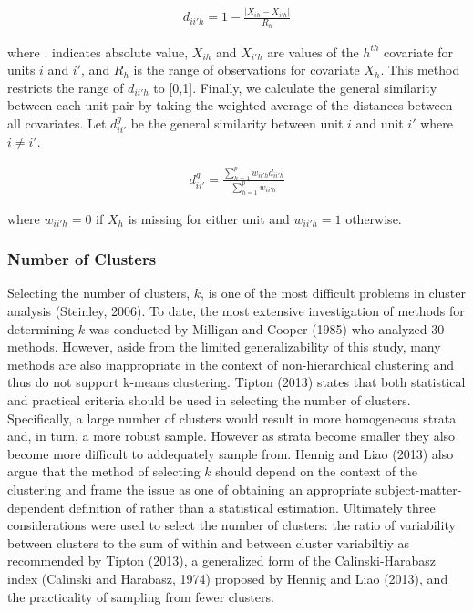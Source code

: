 \documentclass[floatsintext,man]{apa6}
\theoremstyle{definition}
\theoremstyle{definition}
\theoremstyle{definition}
\theoremstyle{remark}
\begin{document}
\begin{align}
  d_{ii'h} = 1 - \frac{|X_{ih} - X_{i'h}|}{R_h}
\end{align}

where \textbar{}.\textbar{} indicates absolute value, \(X_{ih}\) and
\(X_{i'h}\) are values of the \(h^{th}\) covariate for units \(i\) and
\(i'\), and \(R_h\) is the range of observations for covariate \(X_h\).
This method restricts the range of \(d_{ii'h}\) to {[}0,1{]}. Finally,
we calculate the general similarity between each unit pair by taking the
weighted average of the distances between all covariates. Let
\(d^{g}_{ii'}\) be the general similarity between unit \(i\) and unit
\(i'\) where \(i \ne i'\).

\begin{align}
  d^{g}_{ii'} = \frac{\sum^p_{h = 1}w_{ii'h}d_{ii'h}}{\sum^p_{h = 1}w_{ii'h}}
\end{align}

where \(w_{ii'h} = 0\) if \(X_h\) is missing for either unit and
\(w_{ii'h} = 1\) otherwise.

\subsubsection{Number of Clusters}\label{number-of-clusters}

Selecting the number of clusters, \(k\), is one of the most difficult
problems in cluster analysis (Steinley, 2006). To date, the most
extensive investigation of methods for determining \(k\) was conducted
by Milligan and Cooper (1985) who analyzed 30 methods. However, aside
from the limited generalizability of this study, many methods are also
inappropriate in the context of non-hierarchical clustering and thus do
not support k-means clustering. Tipton (2013) states that both
statistical and practical criteria should be used in selecting the
number of clusters. Specifically, a large number of clusters would
result in more homogeneous strata and, in turn, a more robust sample.
However as strata become smaller they also become more difficult to
addequately sample from. Hennig and Liao (2013) also argue that the
method of selecting \(k\) should depend on the context of the clustering
and frame the issue as one of obtaining an appropriate
subject-matter-dependent definition of rather than a statistical
estimation. Ultimately three considerations were used to select the
number of clusters: the ratio of variability between clusters to the sum
of within and between cluster variabiltiy as recommended by Tipton
(2013), a generalized form of the Calinski-Harabasz index (Calinski and
Harabasz, 1974) proposed by Hennig and Liao (2013), and the practicality
of sampling from fewer clusters.
\end{document}
